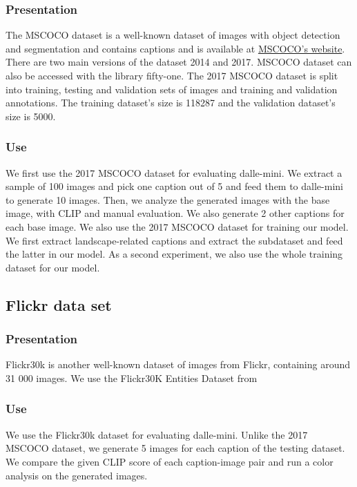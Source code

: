 \documentclass{article}
\begin{document}
\subsubsection{Presentation}

The MSCOCO dataset is a well-known dataset of images with object detection and segmentation and contains captions and is available at \href{https://cocodataset.org/}{MSCOCO's website}. There are two main versions of the dataset 2014 and 2017. MSCOCO dataset can also be accessed with the library fifty-one. The 2017 MSCOCO dataset is split into training, testing and validation sets of images and training and validation annotations. The training dataset's size is 118287 and the validation dataset's size is 5000.

\subsubsection{Use}

We first use the 2017 MSCOCO dataset for evaluating dalle-mini. We extract a sample of 100 images and pick one caption out of 5 and feed them to dalle-mini to generate 10 images. Then, we analyze the generated images with the base image, with CLIP and manual evaluation. We also generate 2 other captions for each base image.
We also use the 2017 MSCOCO dataset for training our model. We first extract landscape-related captions and extract the subdataset and feed the latter in our model. As a second experiment, we also use the whole training dataset for our model.

\subsection{Flickr data set}

\subsubsection{Presentation}

Flickr30k is another well-known dataset of images from Flickr, containing around 31 000 images. We use the Flickr30K Entities Dataset from \cite{flickrentitiesijcv}


\subsubsection{Use}

We use the Flickr30k dataset for evaluating dalle-mini. Unlike the 2017 MSCOCO dataset, we generate 5 images for each caption of the testing dataset. We compare the given CLIP score of each caption-image pair and run a color analysis on the generated images.
\end{document}
